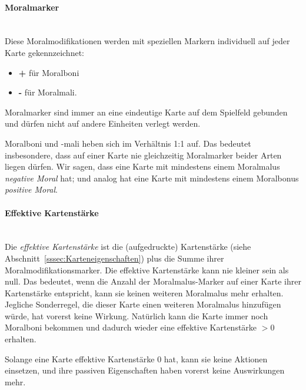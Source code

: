\documentclass[a4paper,11pt]{report}
\newcommand{\sref}[1]{Abschnitt~\ref{#1}}
\begin{document}
\paragraph{Moralmarker}~\\
Diese Moralmodifikationen werden mit speziellen Markern individuell auf jeder Karte gekennzeichnet:
\begin{itemize}
	\item {\color{blue}\textbf{+}} für Moralboni
	\item {\color{red}\textbf{-}} für Moralmali.
\end{itemize}
Moralmarker sind immer an eine eindeutige Karte auf dem Spielfeld gebunden und dürfen nicht auf andere Einheiten verlegt werden.

Moralboni und -mali heben sich im Verhältnis 1:1 auf. Das bedeutet insbesondere, dass auf einer Karte nie gleichzeitig Moralmarker beider Arten liegen dürfen. 
Wir sagen, dass eine Karte mit mindestens einem Moralmalus \emph{negative Moral} hat; und analog hat eine Karte mit mindestens einem Moralbonus \emph{positive Moral}.

\paragraph{Effektive Kartenstärke}~\\
Die \emph{effektive Kartenstärke} ist die (aufgedruckte) Kartenstärke (siehe \sref{sssec:Karteneigenschaften}) plus die Summe ihrer Moralmodifikationsmarker.
Die effektive Kartenstärke kann nie kleiner sein als null. Das bedeutet, wenn die Anzahl der Moralmalus-Marker auf einer Karte ihrer Kartenstärke entspricht, kann sie keinen weiteren Moralmalus mehr erhalten. Jegliche Sonderregel, die dieser Karte einen weiteren Moralmalus hinzufügen würde, hat vorerst keine Wirkung. Natürlich kann die Karte immer noch Moralboni bekommen und dadurch wieder eine effektive Kartenstärke $> 0$ erhalten.

Solange eine Karte effektive Kartenstärke 0 hat, kann sie keine Aktionen einsetzen, und ihre passiven Eigenschaften haben vorerst keine Auswirkungen mehr.
\end{document}
